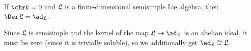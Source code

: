 If $\chr k = 0$ and $\mathfrak{L}$ is a finite-dimensional semisimple Lie algebra,
then $\Der \mathfrak{L} = \ad_{\mathfrak{L}}$.

Since $\mathfrak{L}$ is semisimple
and the kernel of the map $\mathfrak{L} \to \ad_{\mathfrak{L}}$ is an abelian ideal,
it must be zero (since it is trivially soluble), so we additionally get
$\ad_{\mathfrak{L}} \cong \mathfrak{L}$.
